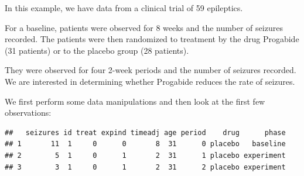 \documentclass[
  ignorenonframetext,
]{beamer}
\newenvironment{Shaded}{\begin{snugshade}}{\end{snugshade}}
\newcommand{\AttributeTok}[1]{\textcolor[rgb]{0.77,0.63,0.00}{#1}}
\newcommand{\DecValTok}[1]{\textcolor[rgb]{0.00,0.00,0.81}{#1}}
\newcommand{\FloatTok}[1]{\textcolor[rgb]{0.00,0.00,0.81}{#1}}
\newcommand{\FunctionTok}[1]{\textcolor[rgb]{0.00,0.00,0.00}{#1}}
\newcommand{\NormalTok}[1]{#1}
\newcommand{\OtherTok}[1]{\textcolor[rgb]{0.56,0.35,0.01}{#1}}
\newcommand{\SpecialCharTok}[1]{\textcolor[rgb]{0.00,0.00,0.00}{#1}}
\newcommand{\StringTok}[1]{\textcolor[rgb]{0.31,0.60,0.02}{#1}}
\begin{document}
\begin{frame}[fragile]{}
\protect\hypertarget{section-1}{}
In this example, we have data from a clinical trial of 59 epileptics.

For a baseline, patients were observed for 8 weeks and the number of
seizures recorded. The patients were then randomized to treatment by the
drug Progabide (31 patients) or to the placebo group (28 patients).

They were observed for four 2-week periods and the number of seizures
recorded. We are interested in determining whether Progabide reduces the
rate of seizures.

We first perform some data manipulations and then look at the first few
observations:

\vspace{12pt}
\tiny

\begin{Shaded}
\end{Shaded}

\begin{verbatim}
##   seizures id treat expind timeadj age period    drug      phase
## 1       11  1     0      0       8  31      0 placebo   baseline
## 2        5  1     0      1       2  31      1 placebo experiment
## 3        3  1     0      1       2  31      2 placebo experiment
\end{verbatim}
\end{frame}
\end{document}
